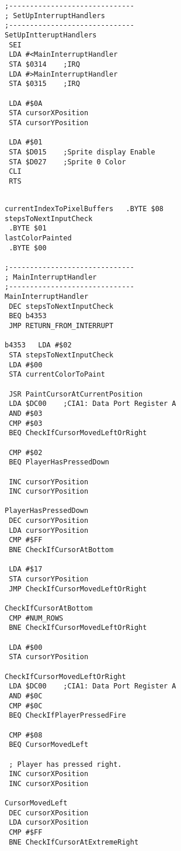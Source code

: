 \begin{minipage}[b]{0.33\linewidth}
\begin{lrbox}{\mybox}
\begin{lstlisting}[basicstyle=\ttfamily\tiny]
;------------------------------
; SetUpInterruptHandlers
;------------------------------
SetUpIntteruptHandlers   
 SEI 
 LDA #<MainInterruptHandler
 STA $0314    ;IRQ
 LDA #>MainInterruptHandler
 STA $0315    ;IRQ

 LDA #$0A
 STA cursorXPosition
 STA cursorYPosition

 LDA #$01
 STA $D015    ;Sprite display Enable
 STA $D027    ;Sprite 0 Color
 CLI 
 RTS 

\end{lstlisting}
\end{lrbox}%
\scalebox{0.8}{\usebox{\mybox}}
\end{minipage}
\hspace{-0.1cm}
\begin{minipage}[b]{0.33\linewidth}
\begin{lrbox}{\mybox}%
\begin{lstlisting}[basicstyle=\ttfamily\tiny]

currentIndexToPixelBuffers   .BYTE $08 
stepsToNextInputCheck 
 .BYTE $01
lastColorPainted
 .BYTE $00

;------------------------------
; MainInterruptHandler
;------------------------------
MainInterruptHandler   
 DEC stepsToNextInputCheck
 BEQ b4353
 JMP RETURN_FROM_INTERRUPT

b4353   LDA #$02
 STA stepsToNextInputCheck
 LDA #$00
 STA currentColorToPaint

 JSR PaintCursorAtCurrentPosition
 LDA $DC00    ;CIA1: Data Port Register A
 AND #$03
 CMP #$03
 BEQ CheckIfCursorMovedLeftOrRight

 CMP #$02
 BEQ PlayerHasPressedDown

 INC cursorYPosition
 INC cursorYPosition

PlayerHasPressedDown   
 DEC cursorYPosition
 LDA cursorYPosition
 CMP #$FF
 BNE CheckIfCursorAtBottom

 LDA #$17
 STA cursorYPosition
 JMP CheckIfCursorMovedLeftOrRight

CheckIfCursorAtBottom   
 CMP #NUM_ROWS
 BNE CheckIfCursorMovedLeftOrRight

 LDA #$00
 STA cursorYPosition

CheckIfCursorMovedLeftOrRight   
 LDA $DC00    ;CIA1: Data Port Register A
 AND #$0C
 CMP #$0C
 BEQ CheckIfPlayerPressedFire

 CMP #$08
 BEQ CursorMovedLeft

 ; Player has pressed right.
 INC cursorXPosition
 INC cursorXPosition

CursorMovedLeft   
 DEC cursorXPosition
 LDA cursorXPosition
 CMP #$FF
 BNE CheckIfCursorAtExtremeRight


\end{lstlisting}
\end{lrbox}
\end{minipage}
